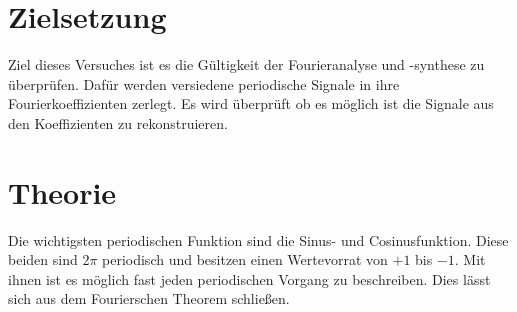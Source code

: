 \section{Zielsetzung}
Ziel dieses Versuches ist es die Gültigkeit der Fourieranalyse und -synthese zu überprüfen.
Dafür werden versiedene periodische Signale in ihre Fourierkoeffizienten zerlegt.
Es wird überprüft ob es möglich ist die Signale aus den Koeffizienten zu rekonstruieren.
\section{Theorie}
\label{sec:Theorie}
Die wichtigsten periodischen Funktion sind die Sinus- und Cosinusfunktion.
Diese beiden sind $2\pi$ periodisch und besitzen einen Wertevorrat von $+1$ bis $-1$.
Mit ihnen ist es möglich fast jeden periodischen Vorgang zu beschreiben.
Dies lässt sich aus dem Fourierschen Theorem schließen.

